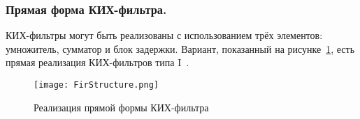 \subsubsection{Прямая форма КИХ-фильтра. }
КИХ-фильтры могут быть реализованы с использованием трёх элементов: умножитель, сумматор и блок задержки. Вариант, показанный на рисунке~\ref{fig:FirStructure}, есть прямая реализация КИХ-фильтров типа I~\cite{Wiki_FIR}.

\begin{figure}[ht]
	\centering
	\texttt{[image: FirStructure.png]}  
	\caption{Реализация прямой формы КИХ-фильтра}
	\label{fig:FirStructure}
\end{figure}